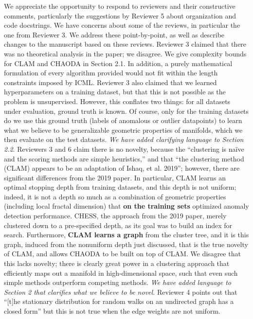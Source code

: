 \documentclass{article}
\begin{document}
We appreciate the opportunity to respond to reviewers and their constructive comments, particularly the suggestions by Reviewer 5 about organization and code docstrings.
We have concerns about some of the reviews, in particular the one from Reviewer 3.
We address these point-by-point, as well as describe changes to the manuscript based on these reviews.
Reviewer 3 claimed that there was no theoretical analysis in the paper; we disagree.
We give complexity bounds for CLAM and CHAODA in Section 2.1.
In addition, a purely mathematical formulation of every algorithm provided would not fit within the length constraints imposed by ICML.
Reviewer 3 also claimed that we learned hyperparameters on a training dataset, but that this is not possible as the problem is unsupervised.
However, this conflates two things: for all datasets under evaluation, ground truth is known.
Of course, only for the training datasets do we use this ground truth (labels of anomalous or outlier datapoints) to learn what we believe to be generalizable geometric properties of manifolds, which we then evaluate on the test datasets.
\emph{We have added clarifying language to Section 2.2}.
Reviewers 3 and 6 claim there is no novelty, because the ``clustering is na\"ive and the scoring methods are simple heuristics,'' and that ``the clustering method (CLAM) appears to be an adaptation of Ishaq, et al. 2019'';
however, there are significant differences from the 2019 paper.
In particular, CLAM learns an optimal stopping depth from training datasets, and this depth is not uniform; indeed, it is not a depth so much as a combination of geometric properties (including local fractal dimension) that \textbf{on the training sets} optimized anomaly detection performance. CHESS, the approach from the 2019 paper, merely clustered down to a pre-specified depth, as its goal was to build an index for search.
Furthermore, \textbf{CLAM learns a graph} from the cluster tree, and it is this graph, induced from the nonuniform depth just discussed, that is the true novelty of CLAM, and allows CHAODA to be built on top of CLAM.
We disagree that this lacks novelty; there is clearly great power in a clustering approach that efficiently maps out a manifold in high-dimensional space, such that even such simple methods outperform competing methods.
\emph{We have added language to Section 2 that clarifies what we believe to be novel.}
Reviewer 4 points out that ``[t]he stationary distribution for random walks on an undirected graph has a closed form'' but this is not true when the edge weights are not uniform.
\end{document}
